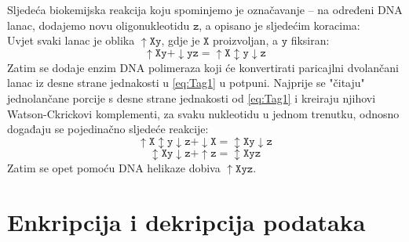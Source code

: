 \documentclass[a4paper,oneside,12pt]{memoir} %
\begin{document}
\begin{spacing}{1.5}
Sljedeća biokemijska reakcija koju spominjemo je označavanje -- na određeni DNA lanac, dodajemo novu oligonukleotidu $\mathtt{z}$, a opisano je sljedećim koracima:\\
Uvjet svaki lanac je oblika $\mathtt{\uparrow Xy}$, gdje je $\mathtt{X}$ proizvoljan, a $\mathtt{y}$ fiksiran:
\begin{equation}
\label{eq:Tag1}
\mathtt{\uparrow Xy + \downarrow yz=\uparrow X \updownarrow y \downarrow z}
\end{equation}
Zatim se dodaje enzim DNA polimeraza koji će konvertirati paricajlni dvolančani lanac iz desne strane jednakosti u \ref{eq:Tag1} u potpuni. Najprije se "čitaju" jednolančane porcije s desne strane jednakosti od \ref{eq:Tag1} i kreiraju njihovi Watson-Ckrickovi komplementi, za svaku nukleotidu u jednom trenutku, odnosno događaju se pojedinačno sljedeće reakcije:
\begin{equation}
\label{eq:Tag2}
\mathtt{\uparrow X \updownarrow y \downarrow z + \downarrow X = \updownarrow Xy \downarrow z}
\end{equation}
\begin{equation}
\label{eq:Tag3}
\mathtt{\updownarrow Xy \downarrow z + \uparrow z = \updownarrow Xyz}
\end{equation}
Zatim se opet pomoću DNA helikaze dobiva $\mathtt{\uparrow Xyz}$.
\section{Enkripcija i dekripcija podataka}

\newpage
\nocite{*}


\end{spacing}
\end{document}
